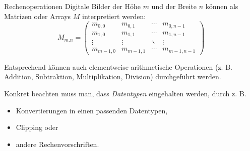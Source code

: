 \begin{bonus}[Bild]{Rechenoperationen}
    Digitale Bilder der Höhe $m$ und der Breite $n$ können als Matrizen oder Arrays $M$ interpretiert werden:
    \[
        M_{m.n} =
        \begin{pmatrix}
            m_{0, 0}   & m_{0, 1}   & \cdots & m_{0, n-1}   \\
            m_{1, 0}   & m_{1, 1}   & \cdots & m_{1, n-1}   \\
            \vdots     & \vdots     & \ddots & \vdots       \\
            m_{m-1, 0} & m_{m-1, 1} & \cdots & m_{m-1, n-1}
        \end{pmatrix}
    \]

    Entsprechend können auch elementweise arithmetische Operationen (z. B. Addition, Subtraktion, Multiplikation, Division) durchgeführt werden.

    Konkret beachten muss man, dass \emph{Datentypen} eingehalten werden, durch z. B.
    \begin{itemize}
        \item Konvertierungen in einen passenden Datentypen,
        \item Clipping oder
        \item andere Rechenvorschriften.
    \end{itemize}
\end{bonus}
